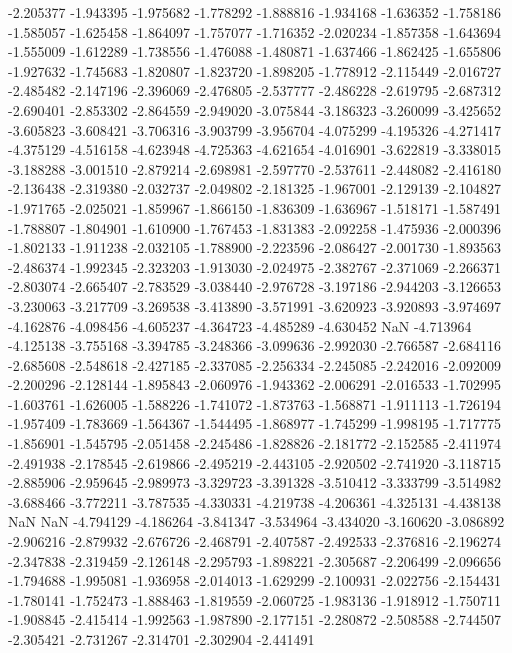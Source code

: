 -2.205377
-1.943395
-1.975682
-1.778292
-1.888816
-1.934168
-1.636352
-1.758186
-1.585057
-1.625458
-1.864097
-1.757077
-1.716352
-2.020234
-1.857358
-1.643694
-1.555009
-1.612289
-1.738556
-1.476088
-1.480871
-1.637466
-1.862425
-1.655806
-1.927632
-1.745683
-1.820807
-1.823720
-1.898205
-1.778912
-2.115449
-2.016727
-2.485482
-2.147196
-2.396069
-2.476805
-2.537777
-2.486228
-2.619795
-2.687312
-2.690401
-2.853302
-2.864559
-2.949020
-3.075844
-3.186323
-3.260099
-3.425652
-3.605823
-3.608421
-3.706316
-3.903799
-3.956704
-4.075299
-4.195326
-4.271417
-4.375129
-4.516158
-4.623948
-4.725363
-4.621654
-4.016901
-3.622819
-3.338015
-3.188288
-3.001510
-2.879214
-2.698981
-2.597770
-2.537611
-2.448082
-2.416180
-2.136438
-2.319380
-2.032737
-2.049802
-2.181325
-1.967001
-2.129139
-2.104827
-1.971765
-2.025021
-1.859967
-1.866150
-1.836309
-1.636967
-1.518171
-1.587491
-1.788807
-1.804901
-1.610900
-1.767453
-1.831383
-2.092258
-1.475936
-2.000396
-1.802133
-1.911238
-2.032105
-1.788900
-2.223596
-2.086427
-2.001730
-1.893563
-2.486374
-1.992345
-2.323203
-1.913030
-2.024975
-2.382767
-2.371069
-2.266371
-2.803074
-2.665407
-2.783529
-3.038440
-2.976728
-3.197186
-2.944203
-3.126653
-3.230063
-3.217709
-3.269538
-3.413890
-3.571991
-3.620923
-3.920893
-3.974697
-4.162876
-4.098456
-4.605237
-4.364723
-4.485289
-4.630452
NaN
-4.713964
-4.125138
-3.755168
-3.394785
-3.248366
-3.099636
-2.992030
-2.766587
-2.684116
-2.685608
-2.548618
-2.427185
-2.337085
-2.256334
-2.245085
-2.242016
-2.092009
-2.200296
-2.128144
-1.895843
-2.060976
-1.943362
-2.006291
-2.016533
-1.702995
-1.603761
-1.626005
-1.588226
-1.741072
-1.873763
-1.568871
-1.911113
-1.726194
-1.957409
-1.783669
-1.564367
-1.544495
-1.868977
-1.745299
-1.998195
-1.717775
-1.856901
-1.545795
-2.051458
-2.245486
-1.828826
-2.181772
-2.152585
-2.411974
-2.491938
-2.178545
-2.619866
-2.495219
-2.443105
-2.920502
-2.741920
-3.118715
-2.885906
-2.959645
-2.989973
-3.329723
-3.391328
-3.510412
-3.333799
-3.514982
-3.688466
-3.772211
-3.787535
-4.330331
-4.219738
-4.206361
-4.325131
-4.438138
NaN
NaN
-4.794129
-4.186264
-3.841347
-3.534964
-3.434020
-3.160620
-3.086892
-2.906216
-2.879932
-2.676726
-2.468791
-2.407587
-2.492533
-2.376816
-2.196274
-2.347838
-2.319459
-2.126148
-2.295793
-1.898221
-2.305687
-2.206499
-2.096656
-1.794688
-1.995081
-1.936958
-2.014013
-1.629299
-2.100931
-2.022756
-2.154431
-1.780141
-1.752473
-1.888463
-1.819559
-2.060725
-1.983136
-1.918912
-1.750711
-1.908845
-2.415414
-1.992563
-1.987890
-2.177151
-2.280872
-2.508588
-2.744507
-2.305421
-2.731267
-2.314701
-2.302904
-2.441491

